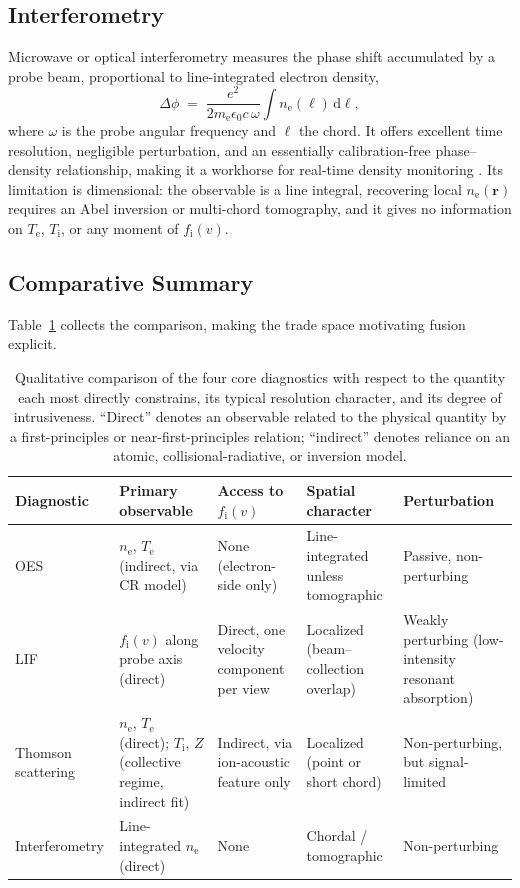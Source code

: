 \subsection{Interferometry}

Microwave or optical interferometry measures the phase shift accumulated by a probe beam, proportional to line-integrated electron density,
\begin{equation}
\Delta \phi \;=\; \frac{e^{2}}{2 m_{\mathrm{e}} \epsilon_{0} c\, \omega} \int n_{\mathrm{e}}(\ell) \, \mathrm{d}\ell ,
\label{ch11-eq:interferometry}
\end{equation}
where $\omega$ is the probe angular frequency and $\ell$ the chord. It offers excellent time resolution, negligible perturbation, and an essentially calibration-free phase--density relationship, making it a workhorse for real-time density monitoring \cite{ref0417}. Its limitation is dimensional: the observable is a line integral, recovering local $n_{\mathrm{e}}(\mathbf{r})$ requires an Abel inversion or multi-chord tomography, and it gives no information on $T_{\mathrm{e}}$, $T_{\mathrm{i}}$, or any moment of $f_{\mathrm{i}}(v)$.

\subsection{Comparative Summary}

Table~\ref{tab:diagnostic_comparison} collects the comparison, making the trade space motivating fusion explicit.

\begin{table}[htbp]
\centering
\caption{Qualitative comparison of the four core diagnostics with respect to the quantity each most directly constrains, its typical resolution character, and its degree of intrusiveness. ``Direct'' denotes an observable related to the physical quantity by a first-principles or near-first-principles relation; ``indirect'' denotes reliance on an atomic, collisional-radiative, or inversion model.}
\label{tab:diagnostic_comparison}
\begin{tabularx}{\textwidth}{@{}l X X X X@{}}
\toprule
Diagnostic & Primary observable & Access to $f_{\mathrm{i}}(v)$ & Spatial character & Perturbation \\
\midrule
OES & $n_{\mathrm{e}}$, $T_{\mathrm{e}}$ (indirect, via CR model) & None (electron-side only) & Line-integrated unless tomographic & Passive, non-perturbing \\
LIF & $f_{\mathrm{i}}(v)$ along probe axis (direct) & Direct, one velocity component per view & Localized (beam--collection overlap) & Weakly perturbing (low-intensity resonant absorption) \\
Thomson scattering & $n_{\mathrm{e}}$, $T_{\mathrm{e}}$ (direct); $T_{\mathrm{i}}$, $Z$ (collective regime, indirect fit) & Indirect, via ion-acoustic feature only & Localized (point or short chord) & Non-perturbing, but signal-limited \\
Interferometry & Line-integrated $n_{\mathrm{e}}$ (direct) & None & Chordal / tomographic & Non-perturbing \\
\bottomrule
\end{tabularx}
\end{table}

